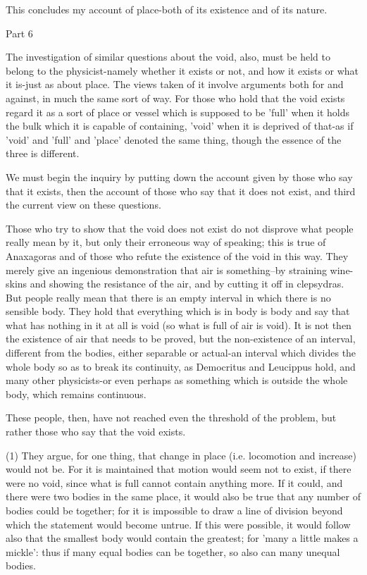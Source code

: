 This concludes my account of place-both of its existence and of its
nature. 

Part 6

The investigation of similar questions about the void, also, must
be held to belong to the physicist-namely whether it exists or not,
and how it exists or what it is-just as about place. The views taken
of it involve arguments both for and against, in much the same sort
of way. For those who hold that the void exists regard it as a sort
of place or vessel which is supposed to be 'full' when it holds the
bulk which it is capable of containing, 'void' when it is deprived
of that-as if 'void' and 'full' and 'place' denoted the same thing,
though the essence of the three is different. 

We must begin the inquiry by putting down the account given by those
who say that it exists, then the account of those who say that it
does not exist, and third the current view on these questions.

Those who try to show that the void does not exist do not disprove
what people really mean by it, but only their erroneous way of speaking;
this is true of Anaxagoras and of those who refute the existence of
the void in this way. They merely give an ingenious demonstration
that air is something--by straining wine-skins and showing the resistance
of the air, and by cutting it off in clepsydras. But people really
mean that there is an empty interval in which there is no sensible
body. They hold that everything which is in body is body and say that
what has nothing in it at all is void (so what is full of air is void).
It is not then the existence of air that needs to be proved, but the
non-existence of an interval, different from the bodies, either separable
or actual-an interval which divides the whole body so as to break
its continuity, as Democritus and Leucippus hold, and many other physicists-or
even perhaps as something which is outside the whole body, which remains
continuous. 

These people, then, have not reached even the threshold of the problem,
but rather those who say that the void exists. 

(1) They argue, for one thing, that change in place (i.e. locomotion
and increase) would not be. For it is maintained that motion would
seem not to exist, if there were no void, since what is full cannot
contain anything more. If it could, and there were two bodies in the
same place, it would also be true that any number of bodies could
be together; for it is impossible to draw a line of division beyond
which the statement would become untrue. If this were possible, it
would follow also that the smallest body would contain the greatest;
for 'many a little makes a mickle': thus if many equal bodies can
be together, so also can many unequal bodies. 

